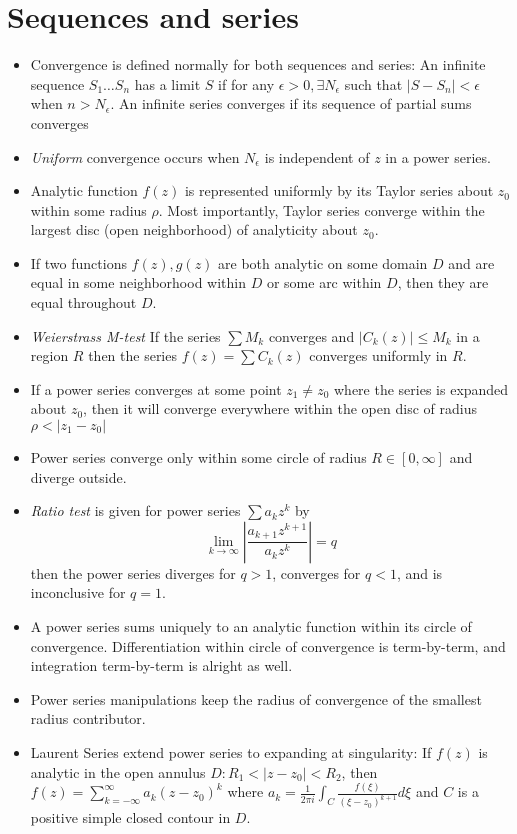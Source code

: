 \documentclass[10pt]{report}
\newcommand{\abs}[1]{\left|#1\right|}
\begin{document}
\section{Sequences and series}
\begin{itemize}
	\item Convergence is defined normally for both sequences and series: An infinite sequence $S_1\dots S_n$ has a limit $S$ if for any $\epsilon > 0, \exists N_\epsilon$ such that $\abs{S-S_n} < \epsilon$ when $n > N_\epsilon$. An infinite series converges if its sequence of partial sums converges
	\item \emph{Uniform} convergence occurs when $N_\epsilon$ is independent of $z$ in a power series.
	\item Analytic function $f(z)$ is represented uniformly by its Taylor series about $z_0$ within some radius $\rho$. Most importantly, Taylor series converge within the largest disc (open neighborhood) of analyticity about $z_0$. 
	\item If two functions $f(z), g(z)$ are both analytic on some domain $D$ and are equal in some neighborhood within $D$ or some arc within $D$, then they are equal throughout $D$. 
	\item \emph{Weierstrass M-test} If the series $\sum M_k$ converges and $\abs{C_k(z)} \leq M_k$ in a region $R$ then the series $f(z) = \sum C_k(z)$ converges uniformly in $R$.
	\item If a power series converges at some point $z_1 \neq z_0$ where the series is expanded about $z_0$, then it will converge everywhere within the open disc of radius $\rho < \abs{z_1 - z_0}$
	\item Power series converge only within some circle of radius $R \in [0,\infty]$ and diverge outside.
	\item \emph{Ratio test} is given for power series $\sum a_kz^k$ by
		$$\lim_{k \to \infty} \abs{\frac{a_{k+1}z^{k+1}}{a_kz^k}} = q$$
		then the power series diverges for $q > 1$, converges for $q < 1$, and is inconclusive for $q = 1$.
	\item A power series sums uniquely to an analytic function within its circle of convergence. Differentiation within circle of convergence is term-by-term, and integration term-by-term is alright as well.
	\item Power series manipulations keep the radius of convergence of the smallest radius contributor.
	\item Laurent Series extend power series to expanding at singularity: If $f(z)$ is analytic in the open annulus $D: R_1 < |z-z_0| < R_2$, then $f(z) = \sum_{k=-\infty}^{\infty}a_k(z-z_0)^k$ where $a_k = \frac{1}{2\pi i} \int_C \frac{f(\xi)}{(\xi-z_0)^{k+1}}d\xi$ and $C$ is a positive simple closed contour in $D$.

\end{itemize}
\end{document}
